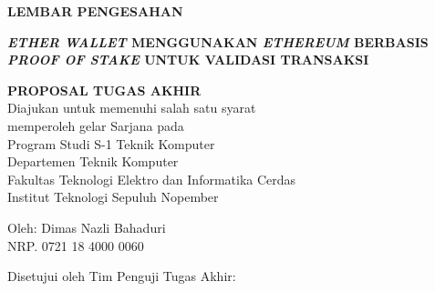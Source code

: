 \begin{center}
	\large
  \textbf{LEMBAR PENGESAHAN}
\end{center}

\thispagestyle{empty}

\begin{center}
  \textbf{\emph{ETHER WALLET} MENGGUNAKAN \emph{ETHEREUM} BERBASIS \emph{PROOF OF STAKE} UNTUK VALIDASI TRANSAKSI}
\end{center}

\begingroup
  \small
  
  \vspace{3ex}

  \begin{center}
    \textbf{PROPOSAL TUGAS AKHIR}
    \\Diajukan untuk memenuhi salah satu syarat
    \\memperoleh gelar Sarjana pada
    \\Program Studi S-1 Teknik Komputer
    \\Departemen Teknik Komputer
    \\Fakultas Teknologi Elektro dan Informatika Cerdas
    \\Institut Teknologi Sepuluh Nopember
  \end{center}

  \vspace{3ex}

  \begin{center}
    Oleh: Dimas Nazli Bahaduri
    \\NRP. 0721 18 4000 0060
  \end{center}

  \vspace{3ex}


  \begin{center}
    Disetujui oleh Tim Penguji Tugas Akhir:
  \end{center}

  \vspace{4ex}

